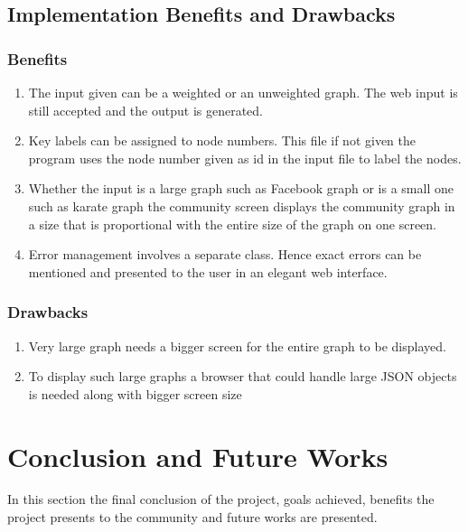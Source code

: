 \section{Implementation Benefits and Drawbacks}
\subsection{Benefits}
\begin{enumerate}
\item The input given can be a weighted or an unweighted graph. The web input is still accepted and the output is generated.
\item Key labels can be assigned to node numbers.  This file if not given the program uses the node number given as id in the input file to label the nodes. 
\item Whether the input is a large graph such as Facebook graph or is a small one such as karate graph the community screen displays the community graph in a size that is proportional with the entire size of the graph on one screen. 
\item Error management involves a separate class. Hence exact errors can be mentioned and presented to the user in an elegant web interface.
\end{enumerate}
\subsection{Drawbacks}
\begin{enumerate}
\item Very large graph needs a bigger screen for the entire graph to be displayed.
\item To display such large graphs a browser that could handle large JSON objects is needed along with bigger screen size
\end{enumerate}

\chapter{Conclusion and Future Works}
In this section the final conclusion of the project, goals achieved, benefits the project presents to the community and future works are presented. 

